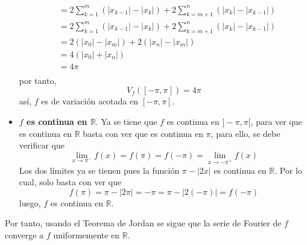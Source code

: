 \documentclass[12pt]{report}
\newcounter{it}
\theoremstyle{largebreak}
\newcommand\abs[1]{\ensuremath{\left|#1\right|}}
\begin{document}
\begin{sol}
\begin{itemize}
\begin{equation*}
\begin{split}
                    &=2\sum_{ k=1}^m(\abs{x_{k-1}}-\abs{x_k})+2\sum_{ k=m+1}^n(\abs{x_k}-\abs{x_{ k-1}})\\
                    &=2\sum_{ k=1}^m(\abs{x_{k-1}}-\abs{x_k})+2\sum_{ k=m+1}^n(\abs{x_k}-\abs{x_{ k-1}})\\
                    &=2(\abs{x_0}-\abs{x_m})+2(\abs{x_n}-\abs{x_m})\\
                    &=4(\abs{x_0}+\abs{x_n})\\
                    &=4\pi\\
                \end{split}
            \end{equation*}
            por tanto,
            \begin{equation*}
                V_f([-\pi,\pi])=4\pi
            \end{equation*}
            así, $f$ es de variación acotada en $[-\pi,\pi]$.
            \item \textbf{$f$ es continua en $\mathbb{R}$}. Ya se tiene que $f$ es continua en $]-\pi,\pi[$, para ver que es continua en $\mathbb{R}$ basta con ver que es continua en $\pi$, para ello, se debe verificar que
            \begin{equation*}
                \lim_{x\rightarrow \pi^-}f(x)=f(\pi)=f(-\pi)=\lim_{x\rightarrow-\pi^+}f(x)
            \end{equation*}
            Los dos límites ya se tienen pues la función $\pi-\abs{2x}$ es continua en $\mathbb{R}$. Por lo cual, solo basta con ver que
            \begin{equation*}
                f(\pi)=\pi-\abs{2\pi}=-\pi=\pi-\abs{2(-\pi)}=f(-\pi)
            \end{equation*}
            luego, $f$ es continua en $\mathbb{R}$.
        \end{itemize}
        Por tanto, usando el Teorema de Jordan se sigue que la serie de Fourier de $f$ converge a $f$ uniformemente en $\mathbb{R}$.


\end{sol}
\end{document}
